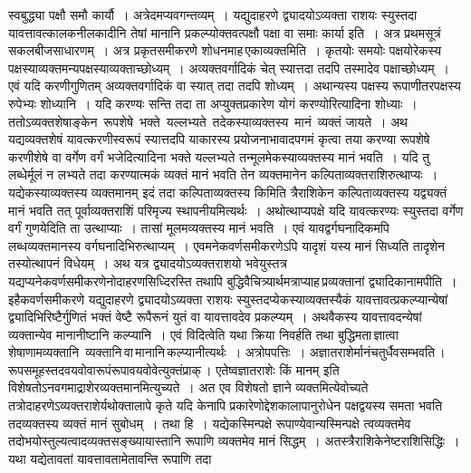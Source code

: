 \documentclass[11pt, openany]{book}
\begin{document}
स्वबुद्ध्या पक्षौ समौ कार्यौ~। अत्रेदमप्यवगन्तव्यम्~। यद्युदाहरणे
द्व्यादयोऽव्यक्ता 
राशयः स्युस्तदा यावत्तावत्कालकनीलकादीनि तेषां मानानि
प्रकल्प्योक्तवत्पक्षौ पक्षा 
वा समाः कार्या इति~। अत्र प्रथमसूत्रं सकलबीजसाधारणम्~। अत्र
प्रकृतसमीकरणे 
शोधनमाह\textendash \,एकाव्यक्तमिति~। कृतयोः समयोः पक्षयोरेकस्य
पक्षस्याव्यक्तमन्यपक्षस्याव्यक्ताच्छोध्यम्~। अव्यक्तवर्गादिकं चेत् स्यात्तदा तदपि तस्मादेव
पक्षाच्छोध्यम्~। 
एवं यदि करणीगुणितम् अव्यक्तवर्गादिकं वा स्यात् तदा तदपि शोध्यम्~। अथान्यस्य
पक्षस्य रूपाणीतरपक्षस्य रुपेभ्यः शोध्यानि~। यदि करण्यः सन्ति तदा ता 
अप्युक्तप्रकारेण योगं करण्योरित्यादिना शोध्याः~। ततोऽव्यक्तशेषाङ्केन \,रूपशेषे \,भक्ते \,यल्लभ्यते \,तदेकस्याव्यक्तस्य \,मानं \,व्यक्तं जायते~। अथ यद्यव्यक्तशेषं
यावत्करणीस्वरूपं 
स्यात्तदपि याकारस्य प्रयोजनाभावादपगमं कृत्वा तया करण्या रूपशेषे
करणीशेषे 
वा वर्गेण वर्गं भजेदित्यादिना भक्ते यल्लभ्यते तन्मूलमेकस्याव्यक्तस्य
मानं भवति~। 
यदि तु लब्धेर्मूलं न लभ्यते तदा करण्यात्मकं व्यक्तं मानं भवति तेन
व्यक्तमानेन 
कल्पिताव्यक्तराशिरुत्थाप्यः~। यद्येकस्याव्यक्तस्य व्यक्तमानम् इदं तदा
कल्पिताव्यक्तस्य 
किमिति त्रैराशिकेन कल्पिताव्यक्तस्य यद्व्यक्तं मानं भवति
तत् पूर्वाव्यक्तराशिं 
परिमृज्य स्थापनीयमित्यर्थः~। अथोत्थाप्यपक्षे यदि यावत्करण्यः स्युस्तदा
वर्गेण वर्गं
गुणयेदिति ता उत्थाप्याः~। तासां मूलमव्यक्तस्य मानं भवति~। एवं
यावद्वर्गघनादिकमपि 
लब्धव्यक्तमानस्य वर्गघनादिभिरुत्थाप्यम्~। एवमनेकवर्णसमीकरणेऽपि यादृशं
यस्य 
मानं सिध्यति तादृशेन तस्योत्थापनं विधेयम्~। अथ यत्र
द्व्यादयोऽव्यक्तराशयो 
भवेयुस्तत्र यद्यप्यनेकवर्णसमीकरणेनोदाहरणसिध्दिरस्ति तथापि
बुद्धिवैचित्र्यार्थमत्राप्याह\textendash \,प्रव्यक्तानां द्व्यादिकानामपीति~। इहैकवर्णसमीकरणे यद्युदाहरणे द्व्यादयोऽव्यक्ता 
राशयः स्युस्तदप्येकस्याव्यक्तस्यैकं यावत्तावत्प्रकल्प्यान्येषां
द्व्यादिभिरिष्टैर्गुणितं 
भक्तं वेष्टै रूपैरूनं युतं वा यावत्तावदेव प्रकल्प्यम्~। अथवैकस्य
यावत्तावदन्येषां 
व्यक्तान्येव मानानीष्टानि कल्प्यानि~। एवं विदित्वेति यथा क्रिया
निवर्हति तथा
\newpage%
\noindent बुद्धिमता\;\,ज्ञात्वा\;\,शेषाणामव्यक्तानि \;\,व्यक्तानि\;\,वा\;\,मानानि\;\,कल्प्यानीत्यर्थः~। अत्रोपपत्तिः~। 
अज्ञातराशेर्मानं\;चतुर्धैव\;सम्भवति\,। रूपसमूहस्तदवयवो\;वा\;रूपं\;रूपावयवो\;वेत्युक्तं\;प्राक्\,। एतेष्वज्ञातराशेः किं मानम् इति
विशेषतोऽनवगमाद्राशेरव्यक्तमानमित्युच्यते~। 
अत एव विशेषतो ज्ञाने व्यक्तमित्येवोच्यते
तत्रोदाहरणेऽव्यक्तराशेर्यथोक्तालापे कृते 
यदि केनापि प्रकारेणोद्देशकालापानुरोधेन पक्षद्वयस्य समता भवति
तदव्यक्तस्य 
व्यक्तं मानं सुबोधम्~। तथा हि~। यद्येकस्मिन्पक्षे
रूपाण्येवान्यस्मिन्पक्षे त्वव्यक्तमेव 
तदोभयोस्तुल्यत्वादव्यक्तसङ्ख्यायास्तानि रूपाणि व्यक्तमेव मानं सिद्धम्~।
अतस्त्रैराशिकेनेष्टराशिसिद्धिः~। यथा यद्येतावतां यावत्तावतामेतावन्ति रूपाणि तदा 
\end{document}
